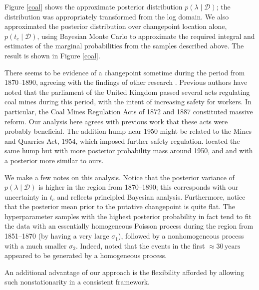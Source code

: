 \documentclass{article}
\newcommand{\cm}[1]{\mathcal{#1}}
\newcommand{\data}{\cm{D}}
\newcommand{\given}{\mid}
\begin{document}
Figure \ref{coal} shows the approximate posterior
distribution $p(\lambda \given \data)$; the distribution was
appropriately transformed from the log domain.  We also approximated
the posterior distribution over changepoint location alone, $p(t_c
\given \data)$, using Bayesian Monte Carlo to approximate the required
integral \citep{bmc} and estimates of the marginal probabilities from
the samples described above.  The result is shown in Figure
\ref{coal}.

There seems to be evidence of a changepoint sometime during the period
from 1870--1890, agreeing with the findings of other research
\citep{jarrett, youngkuo, rafteryakman, westogden, fearnhead,
  adamscp}.  Previous authors have noted that the parliament of the
United Kingdom passed several acts regulating coal mines during this
period, with the intent of increasing safety for workers.  In
particular, the Coal Mines Regulation Acts of 1872 and 1887
constituted massive reform.  Our analysis here agrees with previous
work that these acts were probably beneficial.  The addition hump near
1950 might be related to the Mines and Quarries Act, 1954, which
imposed further safety regulation.  \citet{fearnhead} located the same
hump but with more posterior probability mass around 1950, and
\citet{carlin} and \citet{adamscp} with a posterior more similar to
ours.

We make a few notes on this analysis.  Notice that the posterior
variance of $p(\lambda \given \data)$ is higher in the region from
1870--1890; this corresponds with our uncertainty in $t_c$ and
reflects principled Bayesian analysis.  Furthermore, notice that the
posterior mean prior to the putative changepoint is quite flat.  The
hyperparameter samples with the highest posterior probability in fact
tend to fit the data with an essentially homogeneous Poisson process
during the region from 1851--1870 (by having a very large $\sigma_1$),
followed by a nonhomogeneous process with a much smaller $\sigma_2$.
Indeed, \citet{jarrett} noted that the events in the first $\approx
\!30\,\text{years}$ appeared to be generated by a homogeneous process.

An additional advantage of our approach is the flexibility afforded by
allowing such nonstationarity in a consistent framework.
\end{document}
